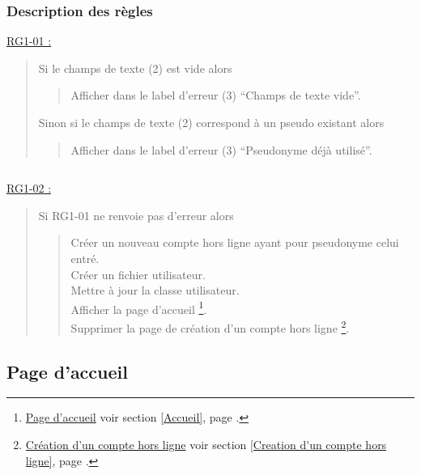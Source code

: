 \documentclass{report}
\begin{document}
		\subsubsection{Description des règles}
		
		\underline{RG1-01 :}
			\begin{quote}
				Si le champs de texte (2) est vide alors
				\begin{quote}
					Afficher dans le label d'erreur (3) ``Champs de texte vide''.
				\end{quote}
				Sinon si le champs de texte (2) correspond à un pseudo existant alors
				\begin{quote}
					Afficher dans le label d'erreur (3) ``Pseudonyme déjà utilisé''.
				\end{quote}		
			\end{quote}
		
		$\,$	

		\underline{RG1-02 :}
			\begin{quote}
				Si RG1-01 ne renvoie pas d'erreur alors
				\begin{quote}
					Créer un nouveau compte hors ligne ayant pour pseudonyme celui entré.\\
					Créer un fichier utilisateur.\\
					Mettre à jour la classe utilisateur.\\
					Afficher la page d'accueil%
						\footnote[1]{
							\hyperlink{Page d'accueil}{Page d'accueil}
							\og voir section \ref{Accueil}, page \pageref{Accueil}.\fg
						}.\\
					Supprimer la page de création d'un compte hors ligne%
						\footnote[2]{
							\hyperlink{Creation d'un compte hors ligne}{Création d'un compte hors ligne}
							\og voir section \ref{Creation d'un compte hors ligne}, page \pageref{Creation d'un compte hors ligne}.\fg
						}.
				\end{quote}
			\end{quote}
	
\newpage

	\subsection{Page d'accueil}
		\hypertarget{Accueil}{}
		\label{Accueil}

		\begin{center}	
			
		\end{center}
\end{document}

